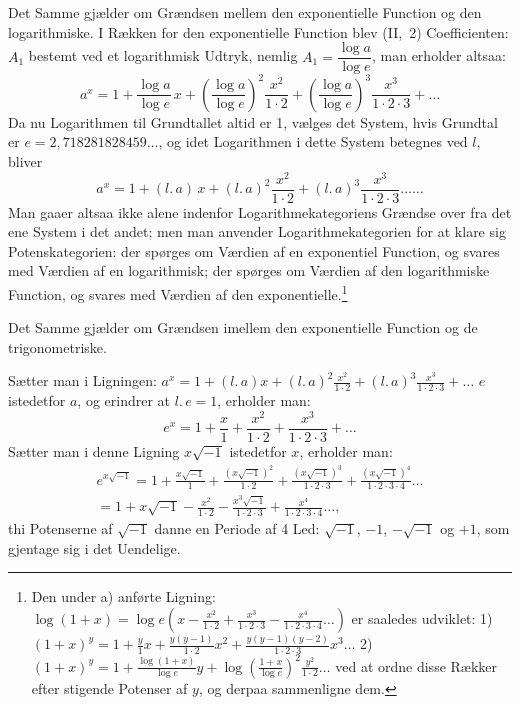 \documentclass[12pt]{book}
\newcommand{\opage}[1]{\marginnote{\footnotesize\textit{[#1]}}}
\begin{document}
Det Samme gjælder om Grændsen mellem den exponentielle Function og den
logarithmiske. I Rækken for den
\opage{36} exponentielle Function blev (II,\ 2) Coefficienten: $A_1$ bestemt ved et
logarithmisk Udtryk, nemlig $A_1 = \dfrac{\log a}{\log e}$, man erholder altsaa:
\[
a^{x} = 1 + \frac{\log a}{\log e}\,x + \left(\frac{\log a}{\log e}\right)^{2}
\frac{x^{2}}{1\cdot 2} + \left(\frac{\log a}{\log e}\right)^{3}\frac{x^{3}}{1\cdot
2\cdot 3} + \dots
\]
Da nu Logarithmen til Grundtallet altid er 1, vælges det System, hvis Grundtal er
$e = 2{,}718281828459\dots$, og idet Logarithmen i dette System betegnes ved $l$,
bliver
\[
a^{x} = 1 + (l.\,a)\,x + (l.\,a)^{2}\frac{x^{2}}{1\cdot 2} + (l.\,a)^{3}
\frac{x^{3}}{1\cdot 2\cdot 3}\dots\dots
\]
Man gaaer altsaa ikke alene indenfor Logarithmekategoriens Grændse over fra det
ene System i det andet; men man anvender Logarithmekategorien for at klare sig
Potenskategorien: der spørges om Værdien af en exponentiel Function, og svares
med Værdien af en logarithmisk; der spørges om Værdien af den logarithmiske
Function, og svares med Værdien af den exponentielle.\footnote{Den under a)
anførte Ligning:
$\log(1+x) = \log e\left(x - \frac{x^{2}}{1\cdot 2} + \frac{x^{3}}{1\cdot 2\cdot
3} - \frac{x^{4}}{1\cdot 2\cdot 3\cdot 4}\dots\right)$
er saaledes udviklet: 1) $(1+x)^{y} = 1 + \frac{y}{1}x +
\frac{y(y-1)}{1\cdot 2}x^{2} + \frac{y(y-1)(y-2)}{1\cdot 2\cdot 3}x^{3}\dots$
2) $(1+x)^{y} = 1 + \frac{\log(1+x)}{\log e}y +
\log\left(\frac{1+x}{\log e}\right)^{2}\frac{y^{2}}{1\cdot 2}\dots$
ved at ordne disse Rækker efter stigende Potenser af $y$, og derpaa sammenligne
dem.}

Det Samme gjælder om Grændsen imellem den exponentielle Function og de
trigonometriske.

Sætter man i Ligningen: $a^{x} = 1 + (l.\,a)x + (l.\,a)^{2}\frac{x^{2}}{1\cdot 2}
+ (l.\,a)^{3}\frac{x^{3}}{1\cdot 2\cdot 3} + \dots$ $e$ istedetfor $a$, og
erindrer at $l.\,e = 1$, erholder man:
\[
e^{x} = 1 + \frac{x}{1} + \frac{x^{2}}{1\cdot 2} + \frac{x^{3}}{1\cdot 2\cdot 3}
+ \dots
\]
\opage{37} Sætter man i denne Ligning $x\sqrt{-1}$ istedetfor $x$, erholder man:
\begin{multline*}
e^{x\sqrt{-1}} = 1 + \frac{x\sqrt{-1}}{1} + \frac{(x\sqrt{-1})^{2}}{1\cdot 2}
+ \frac{(x\sqrt{-1})^{3}}{1\cdot 2\cdot 3} + \frac{(x\sqrt{-1})^{4}}{1\cdot 2\cdot
3\cdot 4}\dots \\
= 1 + x\sqrt{-1} - \frac{x^{2}}{1\cdot 2} - \frac{x^{3}\sqrt{-1}}{1\cdot 2\cdot 3}
+ \frac{x^{4}}{1\cdot 2\cdot 3\cdot 4}\dots,
\end{multline*}
thi Potenserne af $\sqrt{-1}$ danne en Periode af 4 Led: $\sqrt{-1}$, $-1$,
$-\sqrt{-1}$ og $+1$, som gjentage sig i det Uendelige.
\end{document}
